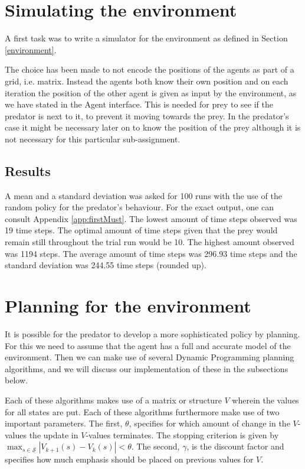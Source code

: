 \documentclass{article}
\begin{document}
\section{Simulating the environment}
A first task was to write a simulator for the environment as defined in Section \ref{environment}.

The choice has been made to not encode the positions of the agents as part of a grid, i.e. matrix. Instead the agents both know their own position and on each iteration the position of the other agent is given as input by the environment, as we have stated in the Agent interface. This is needed for prey to see if the predator is next to it, to prevent it moving towards the prey. In the predator's case it might be necessary later on to know the position of the prey although it is not necessary for this particular sub-assignment.

\subsection{Results}
A mean and a standard deviation was asked for 100 runs with the use of the random policy for the predator's behaviour. For the exact output, one can consult Appendix \ref{app:firstMust}. The lowest amount of time steps observed was 19 time steps. The optimal amount of time steps given that the prey would remain still throughout the trial run would be 10. The highest amount observed was 1194 steps. The average amount of time steps was 296.93 time steps and the standard deviation was 244.55 time steps (rounded up). %


\section{Planning for the environment}\label{simpleStates}
It is possible for the predator to develop a more sophisticated policy by planning. For this we need to assume that the agent has a full and accurate model of the environment. Then we can make use of several Dynamic Programming planning algorithms, and we will discuss our implementation of these in the subsections below.

Each of these algorithms makes use of a matrix or structure $V$ wherein the values for all states are put. Each of these algorithms furthermore make use of two important parameters. The first, $\theta$, specifies for which amount of change in the $V$-values the update in $V$-values terminates. The stopping criterion is given by  $\max_{s \in \mathcal S} | V_{ k+1}(s) - V_{k}(s) | < \theta$.
The second, $\gamma$, is the discount factor and specifies how much emphasis should be placed on previous values for $V$.
\end{document}

